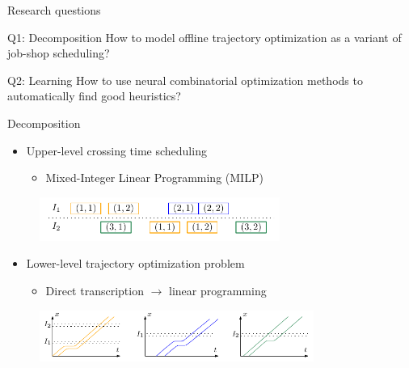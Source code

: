 \documentclass[bigger]{beamer}
\begin{document}
\begin{frame}[label={sec:org916ca91}]{Research questions}

\begin{center}
  \begin{minipage}{0.8\textwidth}

\begin{block}{\small Q1: Decomposition}
\footnotesize \justifying How to model offline trajectory optimization
    as a variant of job-shop scheduling?
\end{block}
\begin{block}{\small Q2: Learning}
\footnotesize \justifying How to use neural combinatorial optimization methods to automatically find  good heuristics?
\end{block}

  \end{minipage}
\end{center}
\end{frame}
\begin{frame}[label={sec:orgd29ec37}]{Decomposition}
\begin{itemize}
\item Upper-level crossing time scheduling
\begin{itemize}
\item Mixed-Integer Linear Programming (MILP)
\end{itemize}
\end{itemize}

\begin{figure}
  \centering
  \includegraphics[width=0.7\textwidth]{figures/network_bilevel-1.pdf}
\end{figure}

\begin{itemize}
\item Lower-level trajectory optimization problem
\begin{itemize}
\item Direct transcription \(\rightarrow\) linear programming
\end{itemize}
\end{itemize}

\begin{figure}
  \centering
  \includegraphics[width=0.8\textwidth]{figures/network_bilevel-2.pdf}
\end{figure}
\end{frame}
\end{document}
